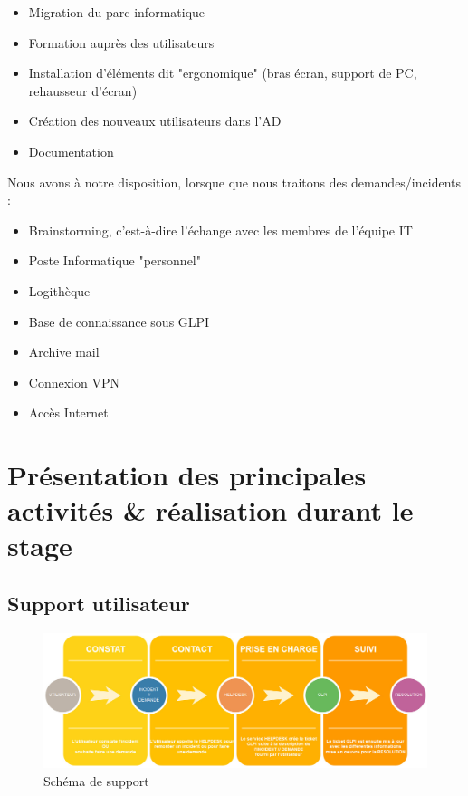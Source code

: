 \documentclass[11pt,a4paper,oneside]{article}
\begin{document}
\begin{itemize}
    \item Migration du parc informatique
    \item Formation auprès des utilisateurs
    \item Installation d'éléments dit "ergonomique" (bras écran, support de PC, rehausseur d'écran) 
    \item Création des nouveaux utilisateurs dans l'AD 
    \item Documentation
\end{itemize}

Nous avons à notre disposition, lorsque que nous traitons des demandes/incidents :

\begin{itemize}
    \item Brainstorming, c'est-à-dire l'échange avec les membres de l'équipe IT
    \item Poste Informatique "personnel"
    \item Logithèque
    \item Base de connaissance sous GLPI
    \item Archive mail
    \item Connexion VPN
    \item Accès Internet 
\end{itemize}

\newpage
\section{Présentation des principales activités \& réalisation durant le stage}
\subsection{Support utilisateur}

\begin{figure}[!h]
\centering
\includegraphics[scale=0.42]{Ressources/GLPI.jpg}
\caption{Schéma de support}
\end{figure}
\end{document}
